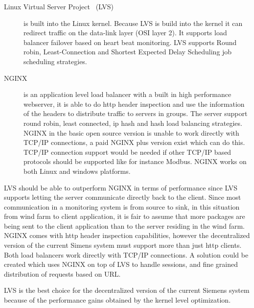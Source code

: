 \begin{description}
\item[Linux Virtual Server Project~\cite{zhang2000linuxVirtualServer} (LVS)] is built into the Linux kernel.
Because LVS is build into the kernel it can redirect traffic on the data-link layer (OSI layer 2).
It supports load balancer failover based on heart beat monitoring.
LVS supports Round robin, Least-Connection and Shortest Expected Delay Scheduling job scheduling strategies.

\item[NGINX~\cite{NGINX_LoadBalancer}] is an application level load balancer with a built in high performance webserver, it is able to do http header inspection and use the information of the headers to distribute traffic to servers in groups.
The server support round robin, least connected, ip hash and hash load balancing strategies. 
NGINX in the basic open source version is unable to work directly with TCP/IP connections, a paid NGINX plus version exist which can do this.
TCP/IP connection support would be needed if other TCP/IP based protocols should be supported like for instance Modbus.
NGINX works on both Linux and windows platforms.

\end{description}
%
LVS should be able to outperform NGINX in terms of performance since LVS supports letting the server communicate directly back to the client.
Since most communication in a monitoring system is from source to sink, in this situation from wind farm to client application, it is fair to assume that more packages are being sent to the client application than to the server residing in the wind farm.
NGINX comes with http header inspection capabilities, however the decentralized version of the current Simens system must support more than just http clients.
Both load balancers work directly with TCP/IP connections.
A solution could be created which uses NGINX on top of LVS to handle sessions, and fine grained distribution of requests based on URL.

LVS is the best choice for the decentralized version of the current Siemens system because of the performance gains obtained by the kernel level optimization.




